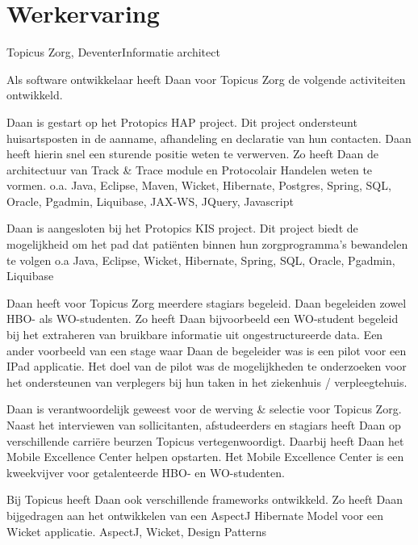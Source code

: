 \section*{Werkervaring}

	\begin{workExperience}{Topicus Zorg, Deventer}{Informatie architect}{}
		
		Als software ontwikkelaar heeft Daan voor Topicus Zorg de volgende
		activiteiten ontwikkeld.
		
		Daan is gestart op het Protopics HAP project. Dit project ondersteunt 
		huisartsposten in de aanname, afhandeling en declaratie van hun 
		contacten. Daan heeft hierin snel een sturende positie weten te 
		verwerven. Zo heeft Daan de architectuur van Track \& Trace module en
		Protocolair Handelen weten te vormen.
		\technics o.a. Java, Eclipse, Maven, Wicket, Hibernate, Postgres, Spring, SQL, Oracle, Pgadmin, Liquibase, JAX-WS, JQuery, Javascript
		
		Daan is aangesloten bij het Protopics KIS project. Dit project biedt
		de mogelijkheid om het pad dat pati\"enten binnen hun zorgprogramma's
		bewandelen te volgen
		\technics o.a Java, Eclipse, Wicket, Hibernate, Spring, SQL, Oracle, Pgadmin, Liquibase
		
		Daan heeft voor Topicus Zorg meerdere stagiars begeleid. Daan begeleiden
		zowel HBO- als WO-studenten. Zo heeft Daan bijvoorbeeld een WO-student
		begeleid bij het extraheren van bruikbare informatie uit 
		ongestructureerde data. Een ander voorbeeld van een stage waar Daan de 
		begeleider was is een pilot voor een IPad applicatie. Het doel van de
		pilot was de mogelijkheden te onderzoeken voor het ondersteunen van
		verplegers bij hun taken in het ziekenhuis / verpleegtehuis.
		
		Daan is verantwoordelijk geweest voor de werving \& selectie voor 
		Topicus Zorg. Naast het interviewen van sollicitanten, afstudeerders en
		stagiars heeft Daan op verschillende carri\"ere beurzen Topicus
		vertegenwoordigt.
		Daarbij heeft Daan het Mobile Excellence Center helpen opstarten. Het
		Mobile Excellence Center is een kweekvijver voor getalenteerde HBO- en
		WO-studenten.
		
		Bij Topicus heeft Daan ook verschillende frameworks ontwikkeld. Zo
		heeft Daan bijgedragen aan het ontwikkelen van een AspectJ Hibernate 
		Model voor een Wicket applicatie.
		\technics AspectJ, Wicket, Design Patterns
	\end{workExperience}

